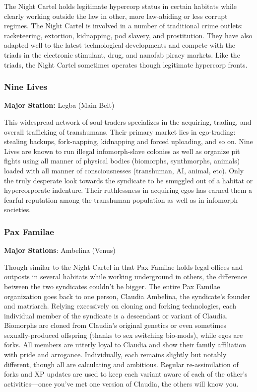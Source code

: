 The Night Cartel holds legitimate hypercorp status in certain habitats while clearly working outside the law in other, more law-abiding or less corrupt regimes. The Night Cartel is involved in a number of traditional crime outlets: racketeering, extortion, kidnapping, pod slavery, and prostitution. They have also adapted well to the latest technological developments and compete with the triads in the electronic stimulant, drug, and nanofab piracy markets. Like the triads, the Night Cartel sometimes operates though legitimate hypercorp fronts. 

\subsubsection{Nine Lives}
\label{sec:nine-lives} 

\textbf{Major Station:} Legba (Main Belt) 

This widespread network of soul-traders specializes in the acquiring, trading, and overall trafficking of transhumans. Their primary market lies in ego-trading: stealing backups, fork-napping, kidnapping and forced uploading, and so on. Nine Lives are known to run illegal infomorph-slave colonies as well as organize pit fights using all manner of physical bodies (biomorphs, synthmorphs, animals) loaded with all manner of consciousnesses (transhuman, AI, animal, etc). Only the truly desperate look towards the syndicate to be smuggled out of a habitat or hypercorporate indenture. Their ruthlessness in acquiring egos has earned them a fearful reputation among the transhuman population as well as in infomorph societies.

\subsubsection{Pax Familae}
\label{sec:pax-familae} 

\textbf{Major Stations}: Ambelina (Venus) 

Though similar to the Night Cartel in that Pax Familae holds legal offices and outposts in several habitats while working underground in others, the difference between the two syndicates couldn't be bigger. The entire Pax Familae organization goes back to one person, Claudia Ambelina, the syndicate's founder and matriarch. Relying excessively on cloning and forking technologies, each individual member of the syndicate is a descendant or variant of Claudia. Biomorphs are cloned from Claudia's original genetics or even sometimes sexually-produced offspring (thanks to sex switching bio-mods), while egos are forks. All members are utterly loyal to Claudia and show their family affiliation with pride and arrogance. Individually, each remains slightly but notably different, though all are calculating and ambitious. Regular re-assimilation of forks and XP updates are used to keep each variant aware of each of the other's activities—once you've met one version of Claudia, the others will know you. 

